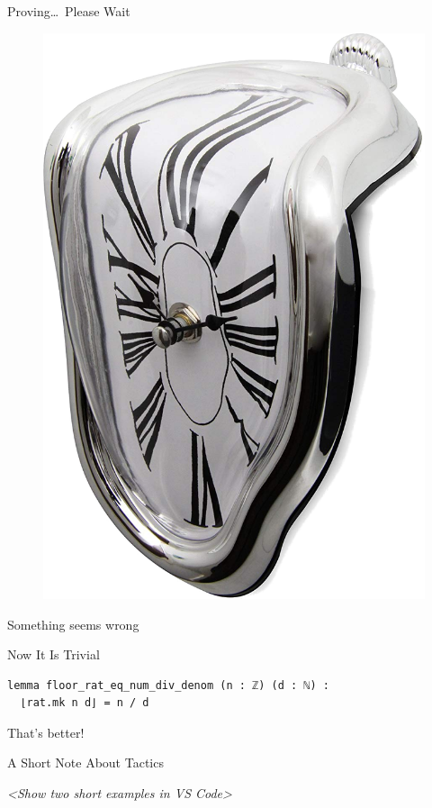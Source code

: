\documentclass{beamer}
\begin{document}
\begin{frame}[fragile]{Proving\dots\ Please Wait}
{\begin{figure}{\includegraphics[height=0.5\textheight]{img/melting_clock.png}}\end{figure}

\vspace{5mm}
\centerline{\alert{Something seems wrong}}
}
\end{frame}
\begin{frame}[fragile]{Now It Is Trivial}
\begin{verbatim}
lemma floor_rat_eq_num_div_denom (n : ℤ) (d : ℕ) :
  ⌊rat.mk n d⌋ = n / d
\end{verbatim}
\vspace{5mm}
\centerline{That's better!}
\end{frame}
\begin{frame}[fragile]{A Short Note About Tactics}
\centerline{\emph{<Show two short examples in VS Code>}}
\end{frame}
\end{document}
